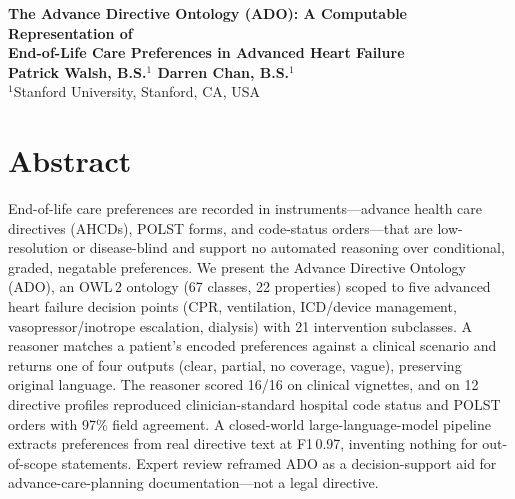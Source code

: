 \documentclass[10pt]{article}
\begin{document}
\begin{center}
{\large\bfseries The Advance Directive Ontology (ADO): A Computable Representation of\\
End-of-Life Care Preferences in Advanced Heart Failure}\\[1em]
{\bfseries Patrick Walsh, B.S.$^{1}$ \quad Darren Chan, B.S.$^{1}$}\\[0.4em]
{$^{1}$Stanford University, Stanford, CA, USA}
\end{center}

\vspace{0.6em}

\section{Abstract}
\begin{itshape}
End-of-life care preferences are recorded in instruments---advance health care directives (AHCDs), POLST forms, and code-status orders---that are low-resolution or disease-blind and support no automated reasoning over conditional, graded, negatable preferences. We present the Advance Directive Ontology (ADO), an OWL\,2 ontology (67 classes, 22 properties) scoped to five advanced heart failure decision points (CPR, ventilation, ICD/device management, vasopressor/inotrope escalation, dialysis) with 21 intervention subclasses. A reasoner matches a patient's encoded preferences against a clinical scenario and returns one of four outputs (clear, partial, no coverage, vague), preserving original language. The reasoner scored 16/16 on clinical vignettes, and on 12 directive profiles reproduced clinician-standard hospital code status and POLST orders with 97\% field agreement. A closed-world large-language-model pipeline extracts preferences from real directive text at F1\,0.97, inventing nothing for out-of-scope statements. Expert review reframed ADO as a decision-support aid for advance-care-planning documentation---not a legal directive.
\end{itshape}
\end{document}
